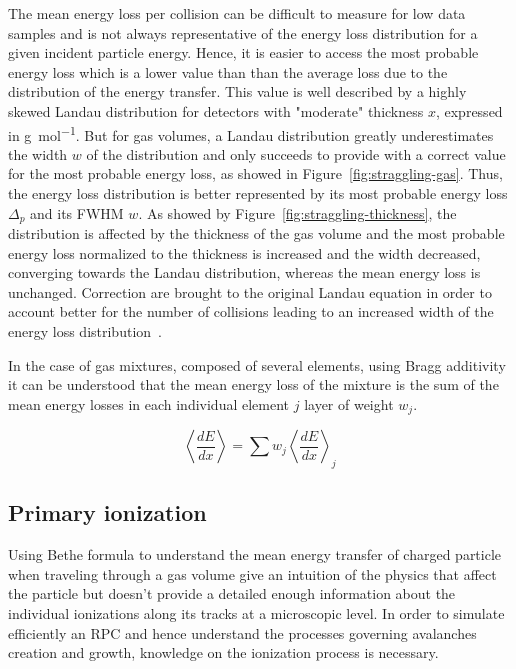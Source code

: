 	The mean energy loss per collision can be difficult to measure for low data samples and is not always representative of the energy loss distribution for a given incident particle energy. Hence, it is easier to access the most probable energy loss which is a lower value than than the average loss due to the distribution of the energy transfer. This value is well described by a highly skewed Landau distribution for detectors with "moderate" thickness $x$, expressed in \si{g.mol^{-1}}. But for gas volumes, a Landau distribution greatly underestimates the width $w$ of the distribution and only succeeds to provide with a correct value for the most probable energy loss, as showed in Figure~\ref{fig:straggling-gas}. Thus, the energy loss distribution is better represented by its most probable energy loss $\Delta_p$ and its \acf{FWHM} $w$. As showed by Figure~\ref{fig:straggling-thickness}, the distribution is affected by the thickness of the gas volume and the most probable energy loss normalized to the thickness is increased and the width decreased, converging towards the Landau distribution, whereas the mean energy loss is unchanged. Correction are brought to the original Landau equation in order to account better for the number of collisions leading to an increased width of the energy loss distribution~\cite{BISCHEL2006}.
	
	In the case of gas mixtures, composed of several elements, using Bragg additivity it can be understood that the mean energy loss of the mixture is the sum of the mean energy losses in each individual element $j$ layer of weight $w_j$.
	
	\begin{equation}
	\label{eq:mixtureloss}
	\left\langle \frac{dE}{dx} \right\rangle = \sum w_j \left\langle \frac{dE}{dx} \right\rangle_j
	\end{equation}
		
	\subsection{Primary ionization}
	\label{chapt4:ssec:ionization}
	
	Using Bethe formula to understand the mean energy transfer of charged particle when traveling through a gas volume give an intuition of the physics that affect the particle but doesn't provide a detailed enough information about the individual ionizations along its tracks at a microscopic level. In order to simulate efficiently an RPC and hence understand the processes  governing avalanches creation and growth, knowledge on the ionization process is necessary.
	
